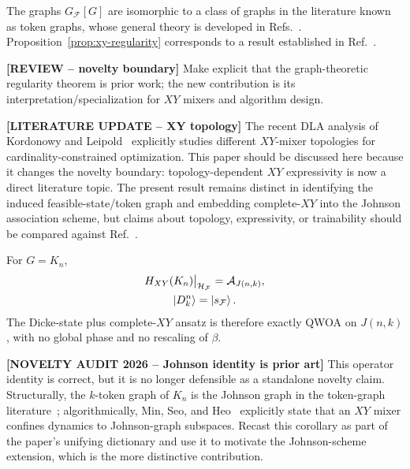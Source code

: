 The graphs $G_{\mathcal{F}}[G]$ are isomorphic to a class of graphs in the literature known as token graphs, whose general theory is developed in Refs.~\cite{FabilaMonroy2012Token,Carballosa2017Regularity}. Proposition~\ref{prop:xy-regularity} corresponds to a result established in Ref.~\cite{Carballosa2017Regularity}.

{\color{red}\textbf{[REVIEW -- novelty boundary]} Make explicit that the graph-theoretic regularity theorem is prior work; the new contribution is its interpretation/specialization for $XY$ mixers and algorithm design.}

{\color{red}\textbf{[LITERATURE UPDATE -- XY topology]} The recent DLA analysis of Kordonowy and Leipold~\cite{Kordonowy2026} explicitly studies different $XY$-mixer topologies for cardinality-constrained optimization. This paper should be discussed here because it changes the novelty boundary: topology-dependent $XY$ expressivity is now a direct literature topic. The present result remains distinct in identifying the induced feasible-state/token graph and embedding complete-$XY$ into the Johnson association scheme, but claims about topology, expressivity, or trainability should be compared against Ref.~\cite{Kordonowy2026}.}

\begin{corollary}
\label{cor:dicke-xy-johnson}
For $G=K_n$,
\begin{equation}
\begin{gathered}
    H_{XY}(K_n)\big|_{\mathcal{H}_{\mathcal{F}}}=\mathcal{A}_{J(n,k)},\\
    \ket{D^n_k}=\ket{s_{\mathcal{F}}} .
\end{gathered}
\end{equation}
The Dicke-state plus complete-$XY$ ansatz is therefore exactly QWOA on $J(n,k)$, with no global phase and no rescaling of $\beta$.
\end{corollary}

{\color{red}\textbf{[NOVELTY AUDIT 2026 -- Johnson identity is prior art]} This operator identity is correct, but it is no longer defensible as a standalone novelty claim. Structurally, the $k$-token graph of $K_n$ is the Johnson graph in the token-graph literature~\cite{FabilaMonroy2012Token}; algorithmically, Min, Seo, and Heo~\cite{MinSeoHeo2026} explicitly state that an $XY$ mixer confines dynamics to Johnson-graph subspaces. Recast this corollary as part of the paper's unifying dictionary and use it to motivate the Johnson-scheme extension, which is the more distinctive contribution.}

